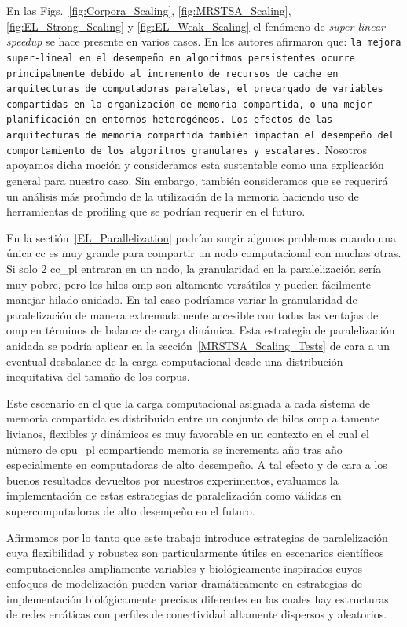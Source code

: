 {En las Figs.~\ref{fig:Corpora_Scaling}, \ref{fig:MRSTSA_Scaling}, \ref{fig:EL_Strong_Scaling} y \ref{fig:EL_Weak_Scaling} el fenómeno de \emph{super-linear speedup} se hace presente en varios casos.
En \cite{7733347} los autores afirmaron que: \texttt{la mejora super-lineal en el desempeño en algoritmos persistentes ocurre principalmente debido al incremento de recursos de cache en arquitecturas de computadoras paralelas, el precargado de variables compartidas en la organización de memoria compartida, o una mejor planificación en entornos heterogéneos.
Los efectos de las arquitecturas de memoria compartida también impactan el desempeño del comportamiento de los algoritmos granulares y escalares.}
Nosotros apoyamos dicha moción y consideramos esta sustentable como una explicación general para nuestro caso. Sin embargo, también consideramos que se requerirá un análisis más profundo de la utilización de la memoria haciendo uso de herramientas de profiling que se podrían requerir en el futuro.

En la sectión~\ref{EL_Parallelization} podrían surgir algunos problemas cuando una única \gls{cc} es muy grande para compartir un nodo computacional con muchas otras.
Si solo 2 \gls{cc_pl} entraran en un nodo, la granularidad en la paralelización sería muy pobre, pero los hilos \gls{omp} son altamente versátiles y pueden fácilmente  manejar hilado anidado.
En tal caso podríamos variar la granularidad de paralelización de manera extremadamente accesible con todas las ventajas de \gls{omp} en términos de balance de carga dinámica.
Esta estrategia de paralelización anidada se podría aplicar en la sección~\ref{MRSTSA_Scaling_Tests} de cara a un eventual desbalance de la carga computacional desde una distribución inequitativa del tamaño de los corpus.

Este escenario en el que la carga computacional asignada a cada sistema de memoria compartida es distribuido entre un conjunto de hilos \gls{omp} altamente livianos, flexibles y dinámicos es muy favorable en un contexto en el cual el número de \gls{cpu_pl} compartiendo memoria se incrementa año tras año especialmente en computadoras de alto desempeño.
A tal efecto y de cara a los buenos resultados devueltos por nuestros experimentos, evaluamos la implementación de estas estrategias de paralelización como válidas en supercomputadoras de alto desempeño en el futuro.

Afirmamos por lo tanto que este trabajo introduce estrategias de paralelización cuya flexibilidad y robustez son particularmente útiles en escenarios científicos computacionales ampliamente variables y biológicamente inspirados cuyos enfoques de modelización pueden variar dramáticamente en estrategias de implementación biológicamente precisas diferentes en las cuales hay estructuras de redes erráticas con perfiles de conectividad altamente dispersos y aleatorios.
}{
}
